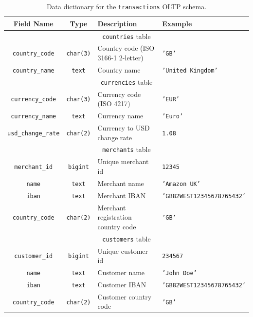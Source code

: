 \documentclass[11pt,a4paper,computermodern]{article}
\newcommand{\code}{\texttt}
\begin{document}
\begin{table}[ht]
	\centering
	\begin{threeparttable}
		\caption{Data dictionary for the \code{transactions} OLTP schema.}
		\label{table:ReferenceDataDict}
		\begin{tabularx}{0.99\textwidth}{c c >{\centering\arraybackslash}X >{\centering\arraybackslash}X}
			\toprule
			Field Name & Type & Description & Example  \\
			\midrule
			\multicolumn{4}{c}{\code{countries} table}\\
			\code{country\_code} & \code{char(3)} & Country code (ISO 3166-1 2-letter) & \code{'GB'} \\
			\code{country\_name} & \code{text} & Country name & \code{'United Kingdom'} \\
			
			\midrule
			\multicolumn{4}{c}{\code{currencies} table}\\
			\code{currency\_code} & \code{char(3)} & Currency code (ISO 4217) & \code{'EUR'} \\
			\code{currency\_name} & \code{text} & Currency name & \code{'Euro'} \\
			\code{usd\_change\_rate} & \code{char(2)} & Currency to USD change rate & \code{1.08} \\
			
			\midrule
			\multicolumn{4}{c}{\code{merchants} table}\\
			\code{merchant\_id} & \code{bigint} & Unique merchant id & \code{12345} \\
			\code{name} & \code{text} & Merchant name & \code{'Amazon UK'} \\
			\code{iban} & \code{text} & Merchant IBAN & \code{'GB82WEST12345678765432'} \\
			\code{country\_code} & \code{char(2)} & Merchant registration country code & \code{'GB'} \\
			
			\midrule
			\multicolumn{4}{c}{\code{customers} table}\\
			\code{customer\_id} & \code{bigint} & Unique customer id & \code{234567} \\
			\code{name} & \code{text} & Customer name & \code{'John Doe'} \\
			\code{iban} & \code{text} & Customer IBAN & \code{'GB82WEST12345678765432'} \\
			\code{country\_code} & \code{char(2)} & Customer country code  & \code{'GB'} \\
			
			\bottomrule
		\end{tabularx}
	\end{threeparttable}
\end{table}
\end{document}

